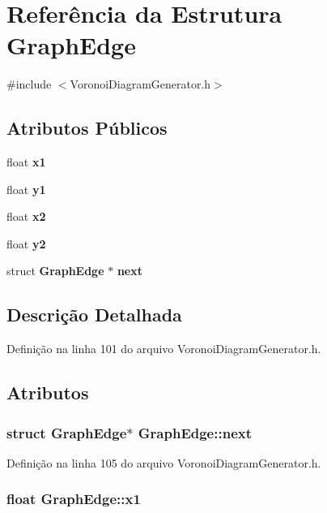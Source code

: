 \section{Referência da Estrutura Graph\+Edge}
\label{struct_graph_edge}


{\ttfamily \#include $<$Voronoi\+Diagram\+Generator.\+h$>$}

\subsection*{Atributos Públicos}
\begin{DoxyCompactItemize}
\item 
float {\bf x1}
\item 
float {\bf y1}
\item 
float {\bf x2}
\item 
float {\bf y2}
\item 
struct {\bf Graph\+Edge} $\ast$ {\bf next}
\end{DoxyCompactItemize}


\subsection{Descrição Detalhada}


Definição na linha 101 do arquivo Voronoi\+Diagram\+Generator.\+h.



\subsection{Atributos}
\subsubsection[{next}]{\setlength{\rightskip}{0pt plus 5cm}struct {\bf Graph\+Edge}$\ast$ Graph\+Edge\+::next}\label{struct_graph_edge_aaeefe441a9565de755ce32b2fc326a80}


Definição na linha 105 do arquivo Voronoi\+Diagram\+Generator.\+h.

\subsubsection[{x1}]{\setlength{\rightskip}{0pt plus 5cm}float Graph\+Edge\+::x1}\label{struct_graph_edge_a80fea57dd2fe3c6300a9ed192302b329}


